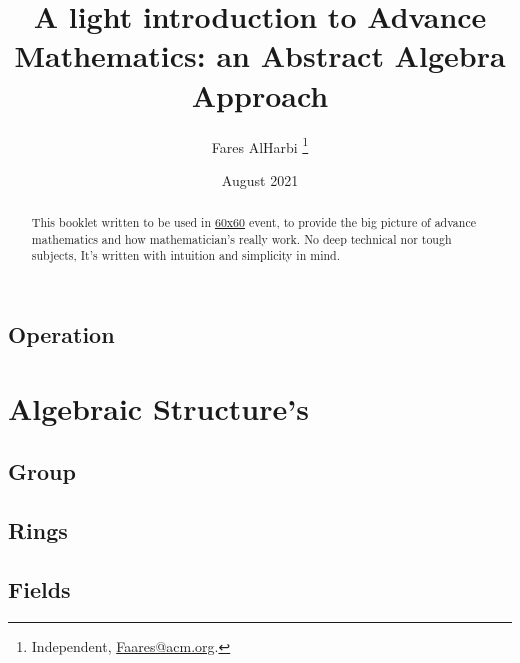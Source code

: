 \documentclass{article}
\title{A light introduction to Advance Mathematics: an Abstract Algebra Approach}
\author{Fares AlHarbi \thanks{Independent, \href{mailto:faares@acm.org}{Faares@acm.org}.}}
\date{August 2021}
\begin{document}
\maketitle
\begin{abstract}
    This booklet written to be used in \hyperlink{https://salla.sa/durba/RYePmz}{60x60} event, to provide the big picture of advance mathematics and how mathematician's really work. No deep technical nor tough subjects, It's written with intuition and simplicity in mind. 
\end{abstract}

\clearpage
\tableofcontents 





\clearpage


\subsection{Operation}

\section{Algebraic Structure's}

\subsection{Group}

\subsection{Rings}

\subsection{Fields}

\clearpage
\printbibliography[heading=bibintoc]
\end{document}
